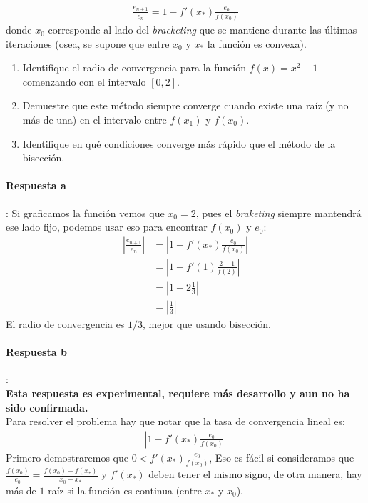 \documentclass[spanish, fleqn]{article}
\begin{document}
\begin{enumerate}
\begin{align*}
\frac{e_{n+1}}{e_n} = 1 - f'(x_*)\frac{e_0}{f(x_0)}
\end{align*}
donde $x_0$ corresponde al lado del \emph{bracketing} que se mantiene durante las últimas iteraciones (osea, se supone que entre $x_0$ y $x_*$ la función es convexa).
\begin{enumerate}
\item Identifique el radio de convergencia para la función $f(x)=x^2-1$ comenzando con el intervalo $[0,2]$.
\item Demuestre que este método siempre converge cuando existe una raíz (y no más de una) en el intervalo entre $f(x_1)$ y $f(x_0)$.
\item Identifique en qué condiciones converge más rápido que el método de la bisección.
\end{enumerate}
\paragraph{Respuesta a}: Si graficamos la función vemos que $x_0=2$, pues el \emph{braketing} siempre mantendrá ese lado fijo, podemos usar eso para encontrar $f(x_0)$ y $e_0$:
\begin{align*}
\left| \frac{e_{n+1}}{e_n} \right|
&= \left| 1 - f'(x_*)\frac{e_0}{f(x_0)} \right|
\\ &= \left| 1 - f'(1)\frac{2-1}{f(2)} \right|
\\ &= \left| 1 - 2\frac{1}{3} \right|
\\ &= \left| \frac{1}{3} \right|
\end{align*}
El radio de convergencia es $1/3$, mejor que usando bisección.
\paragraph{Respuesta b}: \\ \textbf{Esta respuesta es experimental, requiere más desarrollo y aun no ha sido confirmada.} \\ Para resolver el problema hay que notar que la tasa de convergencia lineal es:
\begin{align*}
\left| 1 - f'(x_*)\frac{e_0}{f(x_0)} \right|
\end{align*}
Primero demostraremos que $0<f'(x_*)\frac{e_0}{f(x_0)}$, Eso es fácil si consideramos que $\frac{f(x_0)}{e_0} = \frac{f(x_0)-f(x_*)}{x_0-x_*}$ y $f'(x_*)$ deben tener el mismo signo, de otra manera, hay más de $1$ raíz si la función es continua (entre $x_*$ y $x_0$).


\end{enumerate}
\end{document}
